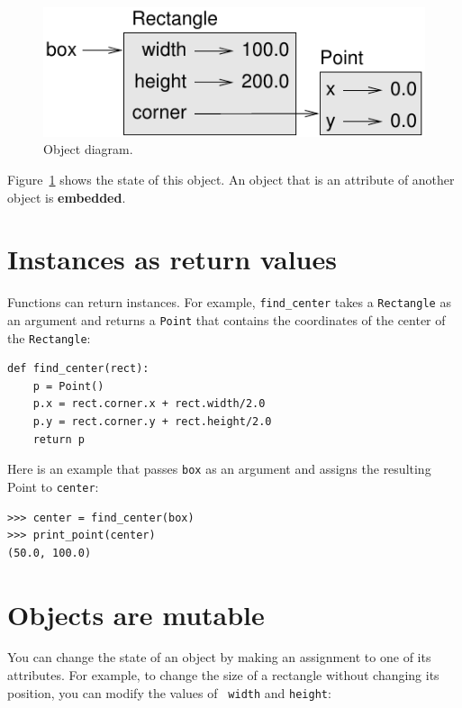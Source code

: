 \documentclass[10pt]{book}
\begin{document}
\begin{CJK}{UTF8}{gbsn}
\begin{figure}
\centerline
{\includegraphics[scale=0.8]{figs/rectangle.pdf}}
\caption{Object diagram.}
\label{fig.rectangle}
\end{figure}


Figure~\ref{fig.rectangle} shows the state of this object.
An object that is an attribute of another object is {\bf embedded}.


\section{Instances as return values}

Functions can return instances.  For example, \verb"find_center"
takes a {\tt Rectangle} as an argument and returns a {\tt Point}
that contains the coordinates of the center of the {\tt Rectangle}:

\begin{verbatim}
def find_center(rect):
    p = Point()
    p.x = rect.corner.x + rect.width/2.0
    p.y = rect.corner.y + rect.height/2.0
    return p
\end{verbatim}
%
Here is an example that passes {\tt box} as an argument and assigns
the resulting Point to {\tt center}:

\begin{verbatim}
>>> center = find_center(box)
>>> print_point(center)
(50.0, 100.0)
\end{verbatim}
%

\section{Objects are mutable}

You can change the state of an object by making an assignment to one of
its attributes.  For example, to change the size of a rectangle
without changing its position, you can modify the values of {\tt
width} and {\tt height}:


\end{CJK}
\end{document}
